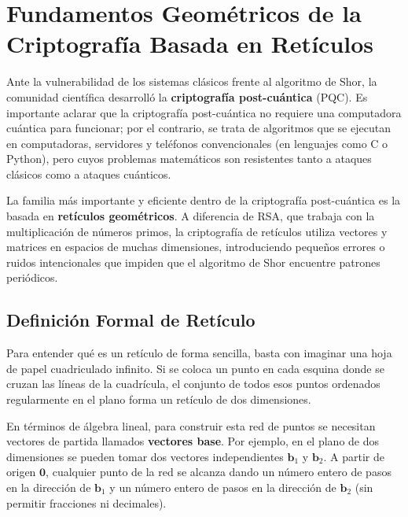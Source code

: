 \section{Fundamentos Geométricos de la Criptografía Basada en Retículos}

Ante la vulnerabilidad de los sistemas clásicos frente al algoritmo de Shor, la comunidad científica desarrolló la \textbf{criptografía post-cuántica} (PQC). Es importante aclarar que la criptografía post-cuántica no requiere una computadora cuántica para funcionar; por el contrario, se trata de algoritmos que se ejecutan en computadoras, servidores y teléfonos convencionales (en lenguajes como C o Python), pero cuyos problemas matemáticos son resistentes tanto a ataques clásicos como a ataques cuánticos.

La familia más importante y eficiente dentro de la criptografía post-cuántica es la basada en \textbf{retículos geométricos}. A diferencia de RSA, que trabaja con la multiplicación de números primos, la criptografía de retículos utiliza vectores y matrices en espacios de muchas dimensiones, introduciendo pequeños errores o ruidos intencionales que impiden que el algoritmo de Shor encuentre patrones periódicos.

\subsection{Definición Formal de Retículo}

Para entender qué es un retículo de forma sencilla, basta con imaginar una hoja de papel cuadriculado infinito. Si se coloca un punto en cada esquina donde se cruzan las líneas de la cuadrícula, el conjunto de todos esos puntos ordenados regularmente en el plano forma un retículo de dos dimensiones.

En términos de álgebra lineal, para construir esta red de puntos se necesitan vectores de partida llamados \textbf{vectores base}. Por ejemplo, en el plano de dos dimensiones se pueden tomar dos vectores independientes $\mathbf{b}_1$ y $\mathbf{b}_2$. A partir de origen $\mathbf{0}$, cualquier punto de la red se alcanza dando un número entero de pasos en la dirección de $\mathbf{b}_1$ y un número entero de pasos en la dirección de $\mathbf{b}_2$ (sin permitir fracciones ni decimales).

